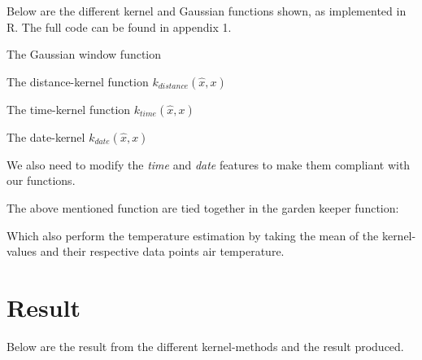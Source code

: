 \documentclass[a4paper, 12pt]{article}
\begin{document}
    Below are the different kernel and Gaussian functions shown, as implemented in R.  The full code can be found in appendix 1.

    The Gaussian window function
    
    
    The distance-kernel function \(k_{distance}(\hat{x}, x)\)
    

    The time-kernel function \(k_{time}(\hat{x}, x)\)
    

    The date-kernel \(k_{date}(\hat{x}, x)\)
    
    
    We also need to modify the \textit{time} and \textit{date} features to make them compliant with our functions.
    

    The above mentioned function are tied together in the garden keeper function:
    
    Which also perform the temperature estimation by taking the mean of the kernel-values and their respective data points air temperature.

    \section{Result}

    Below are the result from the different kernel-methods and the result produced.
    
\end{document}
